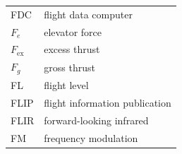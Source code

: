 \documentclass[
]{book}
\begin{document}
\begin{longtable}[]{@{}ll@{}}
\begin{minipage}[t]{0.47\columnwidth}
FDC\strut
\end{minipage} & \begin{minipage}[t]{0.47\columnwidth}\raggedright
flight data computer\strut
\end{minipage}\tabularnewline
\begin{minipage}[t]{0.47\columnwidth}\raggedright
\(F_e\)\strut
\end{minipage} & \begin{minipage}[t]{0.47\columnwidth}\raggedright
elevator force\strut
\end{minipage}\tabularnewline
\begin{minipage}[t]{0.47\columnwidth}\raggedright
\(F_{\mathrm{ex}}\)\strut
\end{minipage} & \begin{minipage}[t]{0.47\columnwidth}\raggedright
excess thrust\strut
\end{minipage}\tabularnewline
\begin{minipage}[t]{0.47\columnwidth}\raggedright
\(F_g\)\strut
\end{minipage} & \begin{minipage}[t]{0.47\columnwidth}\raggedright
gross thrust\strut
\end{minipage}\tabularnewline
\begin{minipage}[t]{0.47\columnwidth}\raggedright
FL\strut
\end{minipage} & \begin{minipage}[t]{0.47\columnwidth}\raggedright
flight level\strut
\end{minipage}\tabularnewline
\begin{minipage}[t]{0.47\columnwidth}\raggedright
FLIP\strut
\end{minipage} & \begin{minipage}[t]{0.47\columnwidth}\raggedright
flight information publication\strut
\end{minipage}\tabularnewline
\begin{minipage}[t]{0.47\columnwidth}\raggedright
FLIR\strut
\end{minipage} & \begin{minipage}[t]{0.47\columnwidth}\raggedright
forward-looking infrared\strut
\end{minipage}\tabularnewline
\begin{minipage}[t]{0.47\columnwidth}\raggedright
FM\strut
\end{minipage} & \begin{minipage}[t]{0.47\columnwidth}\raggedright
frequency modulation\strut

\end{minipage}
\end{longtable}
\end{document}
